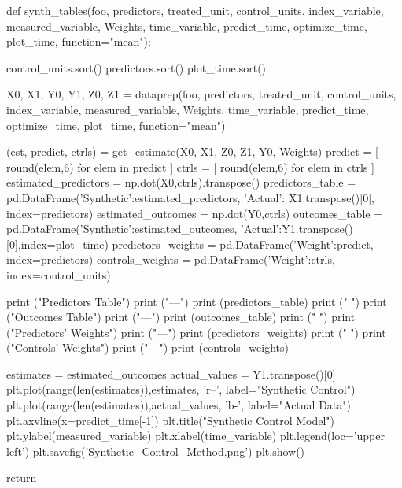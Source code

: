 \documentclass[11pt, a4paper, leqno]{article}
\begin{document}
\begin{python}
def synth_tables(foo, 
                 predictors, 
                 treated_unit, 
                 control_units, 
                 index_variable, 
                 measured_variable,
                 Weights,
                 time_variable,
                 predict_time, 
                 optimize_time, 
                 plot_time,
                 function="mean"):

    control_units.sort()
    predictors.sort()
    plot_time.sort()

    X0, X1, Y0, Y1, Z0, Z1 = dataprep(foo, 
                 predictors, 
                 treated_unit, 
                 control_units, 
                 index_variable, 
                 measured_variable,
                 Weights,
                 time_variable,
                 predict_time, 
                 optimize_time, 
                 plot_time, 
                 function="mean")

    (est, predict, ctrls) = get_estimate(X0, X1, Z0, Z1, Y0, Weights)
    predict = [ round(elem,6) for elem in predict ]
    ctrls = [ round(elem,6) for elem in ctrls ]
    estimated_predictors = np.dot(X0,ctrls).transpose()
    predictors_table = pd.DataFrame({'Synthetic':estimated_predictors, 
                       'Actual': X1.transpose()[0]}, index=predictors)
    estimated_outcomes = np.dot(Y0,ctrls)
    outcomes_table = pd.DataFrame({'Synthetic':estimated_outcomes, 
                    'Actual':Y1.transpose()[0]},index=plot_time)
    predictors_weights = pd.DataFrame({'Weight':predict}, index=predictors)
    controls_weights = pd.DataFrame({'Weight':ctrls}, index=control_units)

    print ("Predictors Table")
    print ("---")
    print (predictors_table)
    print (" ")
    print ("Outcomes Table")
    print ("---")
    print (outcomes_table)
    print (" ")
    print ("Predictors' Weights")
    print ("---")
    print (predictors_weights)
    print (" ")
    print ("Controls' Weights")
    print ("---")
    print (controls_weights)

    estimates = estimated_outcomes
    actual_values = Y1.transpose()[0]
    plt.plot(range(len(estimates)),estimates, 'r--', 
        label="Synthetic Control")
    plt.plot(range(len(estimates)),actual_values, 'b-', 
        label="Actual Data")
    plt.axvline(x=predict_time[-1])
    plt.title("Synthetic Control Model")
    plt.ylabel(measured_variable)
    plt.xlabel(time_variable)
    plt.legend(loc='upper left')
    plt.savefig('Synthetic_Control_Method.png')
    plt.show()
    
    return
\end{python}
\end{document}
